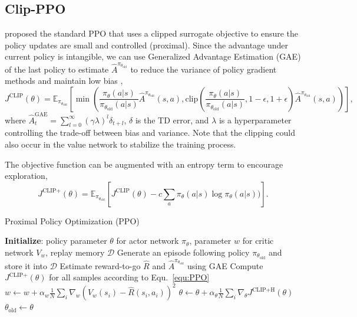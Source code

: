 \documentclass{article} %
\begin{document}
\subsection{Clip-PPO}

\cite{schulman2017proximalpolicyoptimizationalgorithms} proposed the standard PPO  that uses a clipped surrogate objective to ensure the policy updates are small and controlled (proximal). Since the advantage under current policy is intangible, we can use Generalized Advantage Estimation (GAE) of the last policy to estimate $\hat{A}^{\pi_{\theta_{\text{old}}}}$ to reduce the variance of policy gradient methods and maintain low bias \cite{schulman2015gae},
\begin{equation} \label{equ:Clip-PPO}
J^{\text{CLIP}}(\theta) = \mathbb{E}_{\pi_{\theta_{\text{old}}}} \left[ \min \left( \frac{\pi_{\theta}(a|s)}{\pi_{\theta_{\text{old}}}(a|s)} \hat{A}^{\pi_{\theta_{\text{old}}}}(s, a), \text{clip}(\frac{\pi_{\theta}(a|s)}{\pi_{\theta_{\text{old}}}(a|s)}, 1 - \epsilon, 1 + \epsilon) \hat{A}^{\pi_{\theta_{\text{old}}}}(s, a) \right) \right],
\end{equation}
where $\hat{A}^\text{GAE}_t = \sum_{l=0}^{\infty} (\gamma \lambda)^l \delta_{t+l}$, $\delta$ is the TD error, and $\lambda$ is a hyperparameter controlling the trade-off between bias and variance. Note that the clipping could also occur in the value network to stabilize the training process.

The objective function can be augmented with an entropy term to encourage exploration,
\begin{equation} \label{equ:PPO}
    J^{\text{CLIP+}}(\theta) =\mathbb{E}_{\pi_{\theta_{\text{old}}}} \left[J^{\text{CLIP}}(\theta)- c\sum_{a} \pi_{\theta}(a|s) \log \pi_{\theta}(a|s))\right].
\end{equation}

\begin{algorithm}[H]
\caption{Proximal Policy Optimization (PPO)}
\begin{algorithmic}[1]
\State \textbf{Initialize}: policy parameter $\theta$ for actor network $\pi_{\theta}$, parameter $w$ for critic network $V_{w}$, replay memory $\mathcal{D}$
    \State Generate an episode following policy $\pi_{\theta_{\text{old}}}$ and store it into $\mathcal{D}$
    \State Estimate reward-to-go $\hat{R}$ and $\hat{A}^{\pi_{\theta_{\text{old}}}}$ using GAE
            \State Compute $J^{\text{CLIP+}}(\theta)$ for all samples according to Equ.~\ref{equ:PPO}
            \State $w \leftarrow w + \alpha_w \frac{1}{N}\sum_i\nabla_w (V_w(s_i)-\hat{R}(s_i, a_i))^2$
            \State $\theta \leftarrow \theta + \alpha_\theta \frac{1}{N}\sum_i \nabla_\theta J^{\text{CLIP+H}}(\theta)$
        \EndFor
    \State $\theta_{\text{old}} \leftarrow \theta$
\EndFor
\end{algorithmic}
\end{algorithm}
\end{document}
